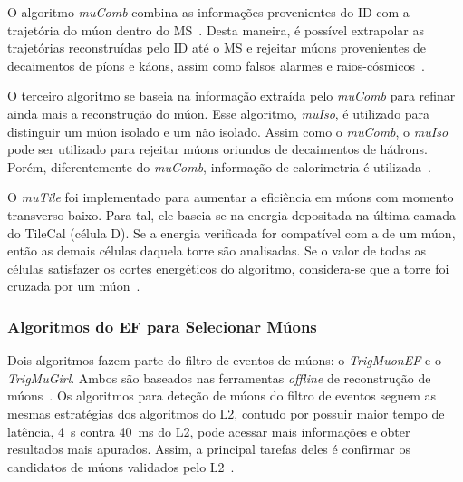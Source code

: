 O algoritmo \emph{muComb} combina as informações provenientes do ID com a
trajetória do múon dentro do MS~\cite{VENTURA2010}. Desta maneira, é possível
extrapolar as trajetórias reconstruídas pelo ID até o MS e rejeitar múons
provenientes de decaimentos de píons e káons, assim como falsos alarmes e
raios-cósmicos~\cite{COSMICRAY2010}.


O terceiro algoritmo se baseia na informação extraída pelo \emph{muComb} para
refinar ainda mais a reconstrução do múon. Esse algoritmo, \emph{muIso}, é
utilizado para distinguir um múon isolado e um não isolado. Assim como o
\emph{muComb}, o \emph{muIso} pode ser utilizado para rejeitar múons oriundos de decaimentos
de hádrons. Porém, diferentemente do \emph{muComb}, informação de calorimetria é
utilizada~\cite{VENTURA2010}.


O \emph{muTile} foi implementado para aumentar a eficiência em múons com momento
transverso baixo. Para tal, ele baseia-se na energia depositada na última camada
do TileCal (célula D). Se a energia verificada for compatível com a de um múon,
então as demais células daquela torre são analisadas. Se o valor de todas as
células satisfazer os cortes energéticos do algoritmo, considera-se que a torre
foi cruzada por um múon~\cite{USAI2004}.

\subsubsection{Algoritmos do EF para Selecionar Múons}

Dois algoritmos fazem parte do filtro de eventos de múons: o \emph{TrigMuonEF} e
o \emph{TrigMuGirl}. Ambos são baseados nas ferramentas \emph{offline} de
reconstrução de múons~\cite{ARMSTRONG2004}.
Os algoritmos para deteção de múons do filtro de eventos seguem as mesmas
estratégias dos algoritmos do L2, contudo por possuir maior tempo de latência,
4~s contra 40~ms do L2, pode acessar mais informações e obter resultados mais
apurados. Assim, a principal tarefas deles é confirmar os candidatos de múons
validados pelo L2~\cite{VENTURA2010}.
